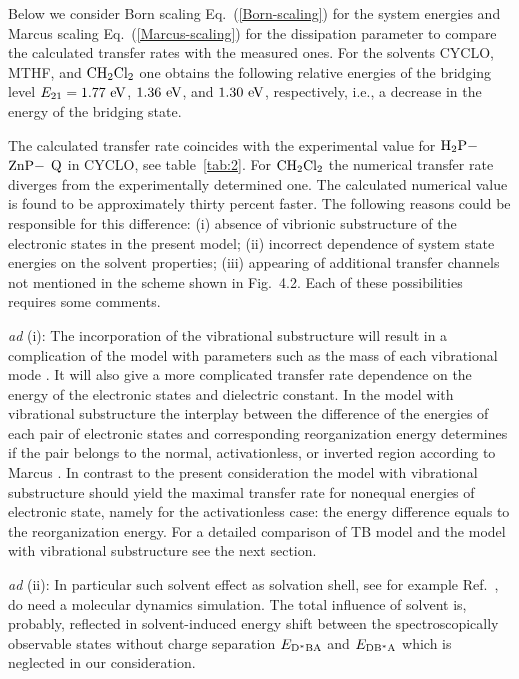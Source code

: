 \documentclass[12pt,twoside,a4paper]{report}
\begin{document}
Below we consider Born scaling 
Eq.~(\ref{Born-scaling}) for the system energies
and Marcus scaling 
Eq.~(\ref{Marcus-scaling}) for the dissipation parameter to compare the
calculated transfer rates with the measured ones.  For the solvents CYCLO,
MTHF, and ${\rm CH_2Cl_2}$ one obtains the  following relative energies of the bridging
level $E_{21}=1.77~ {\rm eV}$, $1.36~ {\rm eV}$, and $1.30~ {\rm eV}$, respectively, i.e.,
a decrease in the energy of the bridging state.


The calculated transfer rate coincides with the experimental value 
\cite{r4} for 
${\rm H_2P-}$
${\rm ZnP-}$
${\rm Q}$
in CYCLO, see table~\ref{tab:2}.
For ${\rm CH_2Cl_2}$ the numerical transfer rate diverges from the
experimentally determined one.  The calculated numerical value is
found to be approximately thirty percent faster.  The following
reasons could be responsible for this difference: (i) absence of
vibrionic substructure of the electronic states in the present model;
(ii) incorrect dependence of system state energies on the solvent
properties; (iii) appearing of additional
transfer channels not mentioned in the scheme shown in Fig.~4.2.  
Each of these possibilities  requires some comments.

{\it ad} (i): 
The incorporation of the vibrational substructure will result in a
complication of the model with parameters such as 
the mass of each vibrational mode \cite{schr98b,schr99}.  
It will also give a
more complicated transfer rate dependence on the energy of the
electronic states and dielectric constant.  In the model with
vibrational substructure the interplay between the difference of the
energies of each pair of electronic states and corresponding
reorganization energy determines 
if the pair belongs to the normal, activationless, or inverted
region according to Marcus \cite{marc56}. In contrast to the present
consideration the model with vibrational substructure should yield the maximal
transfer rate for nonequal energies of electronic state, namely for
the activationless case: the energy difference equals to the
reorganization energy. For a detailed comparison of 
TB model and
the model with vibrational substructure see the next section.

{\it ad} (ii): 
In particular such solvent effect as solvation shell, 
see for example Ref.~\cite{cich98}, 
do need a molecular dynamics simulation. The total
influence of solvent is, probably, reflected in solvent-induced energy shift between
the spectroscopically observable states 
without charge separation
$E_{\rm D^*BA}$ and $E_{\rm DB^*A}$
\cite{r4}
which is neglected in our consideration.
\end{document}
